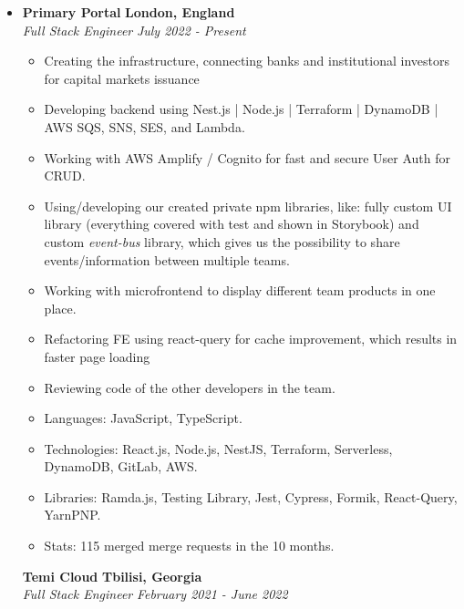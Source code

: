 \documentclass[10pt,letterpaper]{article}
\begin{document}
  \begin{itemize}
    \item[]

    {\textbf{Primary Portal} \hfill
    \textbf{London, England}}
  \\
  {\emph{Full Stack Engineer} \hfill \emph{July 2022 - Present}}

  \begin{itemize}[label=\textbullet]
  \itemsep0.5em
  \item Creating the infrastructure, connecting banks and institutional investors for capital markets issuance
  \item Developing backend using Nest.js | Node.js | Terraform | DynamoDB | AWS SQS, SNS, SES, and Lambda.
  \item Working with AWS Amplify / Cognito for fast and secure User Auth for CRUD.
  \item Using/developing our created private npm libraries, like: fully custom UI library (everything covered with test and shown in Storybook) and custom \emph{event-bus} library, which gives us the possibility to share events/information between multiple teams.
  \item Working with microfrontend to display different team products in one place.
  \item Refactoring FE using react-query for cache improvement, which results in faster page loading 
  \item Reviewing code of the other developers in the team.
  \item Languages: JavaScript, TypeScript.
  \item Technologies: React.js, Node.js, NestJS, Terraform, Serverless, DynamoDB, GitLab, AWS.
  \item Libraries: Ramda.js, Testing Library, Jest, Cypress, Formik, React-Query, YarnPNP.
  \item Stats: 115 merged merge requests in the 10 months.

  \end{itemize}


   {\textbf{Temi Cloud} \hfill
      \textbf{Tbilisi, Georgia}}
    \\
    {\emph{Full Stack Engineer} \hfill \emph{February 2021 - June 2022}}


\end{itemize}
\end{document}
